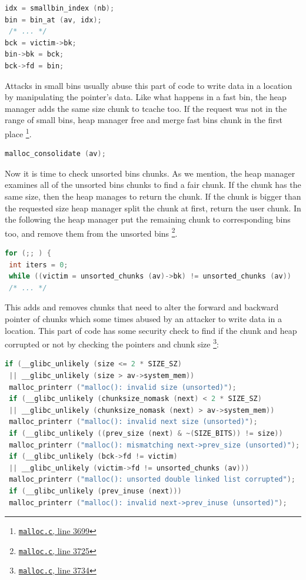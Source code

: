 \documentclass{masterthesis}
\newcommand*\tch{tcache}
\newcommand*\fb{fast bins}
\newcommand*\ub{unsorted bins}
\newcommand*\sbs{small bins}
\begin{document}
\begin{lstlisting}[language=c,frame=tlrb]
idx = smallbin_index (nb);
bin = bin_at (av, idx);
 /* ... */
bck = victim->bk;
bin->bk = bck;
bck->fd = bin;
\end{lstlisting}

Attacks in \sbs{} usually abuse this part of code to write data in a location by manipulating the pointer's data. Like what happens in a fast bin, the heap manager adds the same size chunk to \tch{} too. If the request was not in the range of \sbs{}, heap manager free and merge \fb{} chunk in the first place \footnote{\href{https://sourceware.org/git/?p=glibc.git;a=blob;f=malloc/malloc.c;h=f7cd29bc2f93e1082ee77800bd64a4b2a2897055;hb=9ea3686266dca3f004ba874745a4087a89682617\#l3699}{\texttt{malloc.c}, line 3699}}.
\begin{lstlisting}[language=c,frame=tlrb]
malloc_consolidate (av);
\end{lstlisting}

Now it is time to check \ub{} chunks. As we mention, the heap manager examines all of the \ub{} chunks to find a fair chunk. If the chunk has the same size, then the heap manages to return the chunk. If the chunk is bigger than the requested size heap manager split the chunk at first, return the user chunk. In the following the heap manager put the remaining chunk to corresponding bins too, and remove them from the \ub{} \footnote{\href{https://sourceware.org/git/?p=glibc.git;a=blob;f=malloc/malloc.c;h=f7cd29bc2f93e1082ee77800bd64a4b2a2897055;hb=9ea3686266dca3f004ba874745a4087a89682617\#l3725}{\texttt{malloc.c}, line 3725}}.

\begin{lstlisting}[language=c]
for (;; ) {
 int iters = 0;
 while ((victim = unsorted_chunks (av)->bk) != unsorted_chunks (av))
 /* ... */
\end{lstlisting}
This adds and removes chunks that need to alter the forward and backward pointer of chunks which some times abused by an attacker to write data in a location. This part of code has some security check to find if the chunk and heap corrupted or not by checking the pointers and chunk size \footnote{\href{https://sourceware.org/git/?p=glibc.git;a=blob;f=malloc/malloc.c;h=f7cd29bc2f93e1082ee77800bd64a4b2a2897055;hb=9ea3686266dca3f004ba874745a4087a89682617\#l3734}{\texttt{malloc.c}, line 3734}}:
\begin{lstlisting}[language=c,frame=tlrb]
 if (__glibc_unlikely (size <= 2 * SIZE_SZ)
 || __glibc_unlikely (size > av->system_mem))
 malloc_printerr ("malloc(): invalid size (unsorted)");
 if (__glibc_unlikely (chunksize_nomask (next) < 2 * SIZE_SZ)
 || __glibc_unlikely (chunksize_nomask (next) > av->system_mem))
 malloc_printerr ("malloc(): invalid next size (unsorted)");
 if (__glibc_unlikely ((prev_size (next) & ~(SIZE_BITS)) != size))
 malloc_printerr ("malloc(): mismatching next->prev_size (unsorted)");
 if (__glibc_unlikely (bck->fd != victim)
 || __glibc_unlikely (victim->fd != unsorted_chunks (av)))
 malloc_printerr ("malloc(): unsorted double linked list corrupted");
 if (__glibc_unlikely (prev_inuse (next)))
 malloc_printerr ("malloc(): invalid next->prev_inuse (unsorted)");
\end{lstlisting}
\end{document}

